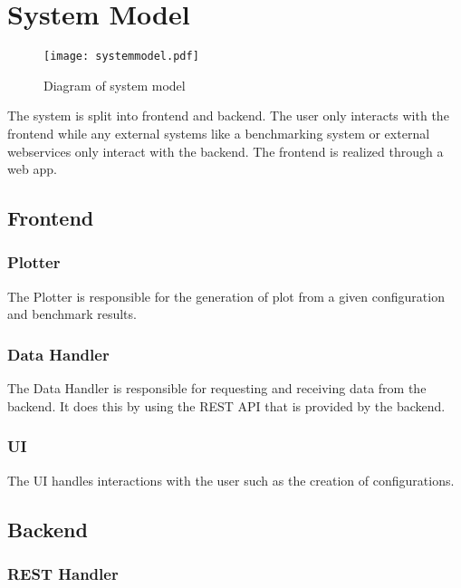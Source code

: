 \section{System Model}

\begin{figure}[H]
    \texttt{[image: systemmodel.pdf]}
    \caption{Diagram of system model}
    \label{fig:systemmodel}
\end{figure}

The system is split into frontend and backend. The user only interacts with the frontend while any external systems like a benchmarking system or external webservices only interact with the backend. The frontend is realized through a web app.

\subsection{Frontend}

\subsubsection*{Plotter}

The Plotter is responsible for the generation of \gls{plot} from a given \gls{configuration} and benchmark results. 

\subsubsection*{Data Handler}

The Data Handler is responsible for requesting and receiving data from the backend. It does this by using the \gls{REST API} that is provided by the backend.

\subsubsection*{UI}

The UI handles interactions with the user such as the creation of \glspl{configuration}.

\subsection{Backend}

\subsubsection*{REST Handler}

